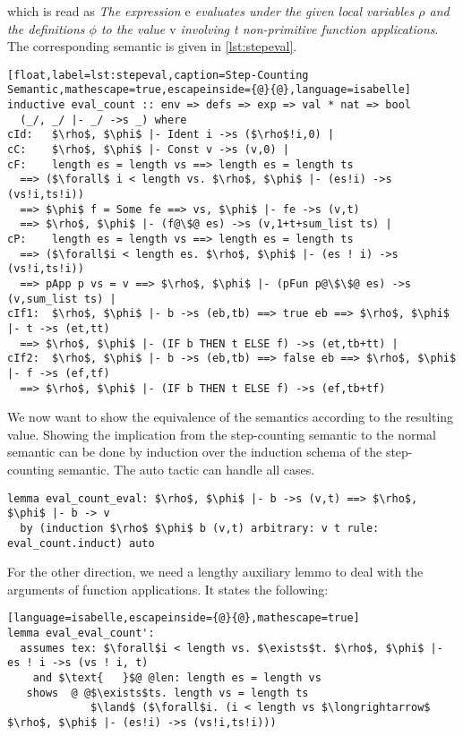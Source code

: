 which is read as \textit{The expression $\text{e}$ evaluates under the given local variables $\rho$ and the definitions $\phi$ to the value $\text{v}$ involving t non-primitive function applications}. The corresponding semantic is given in \autoref{lst:stepeval}.
\begin{lstlisting}[float,label=lst:stepeval,caption=Step-Counting Semantic,mathescape=true,escapeinside={@}{@},language=isabelle]
inductive eval_count :: env => defs => exp => val * nat => bool
  (_/, _/ |- _/ ->s _) where
cId:   $\rho$, $\phi$ |- Ident i ->s ($\rho$!i,0) |
cC:    $\rho$, $\phi$ |- Const v ->s (v,0) |
cF:    length es = length vs ==> length es = length ts
  ==> ($\forall$ i < length vs. $\rho$, $\phi$ |- (es!i) ->s (vs!i,ts!i))
  ==> $\phi$ f = Some fe ==> vs, $\phi$ |- fe ->s (v,t)
  ==> $\rho$, $\phi$ |- (f@\$@ es) ->s (v,1+t+sum_list ts) |
cP:    length es = length vs ==> length es = length ts
  ==> ($\forall$i < length es. $\rho$, $\phi$ |- (es ! i) ->s (vs!i,ts!i))
  ==> pApp p vs = v ==> $\rho$, $\phi$ |- (pFun p@\$\$@ es) ->s (v,sum_list ts) |
cIf1:  $\rho$, $\phi$ |- b ->s (eb,tb) ==> true eb ==> $\rho$, $\phi$ |- t ->s (et,tt)
  ==> $\rho$, $\phi$ |- (IF b THEN t ELSE f) ->s (et,tb+tt) |
cIf2:  $\rho$, $\phi$ |- b ->s (eb,tb) ==> false eb ==> $\rho$, $\phi$ |- f ->s (ef,tf)
  ==> $\rho$, $\phi$ |- (IF b THEN t ELSE f) ->s (ef,tb+tf)
\end{lstlisting}

We now want to show the equivalence of the semantics according to the resulting value.
Showing the implication from the step-counting semantic to the normal semantic can be done by induction over the induction schema of the step-counting semantic.
The auto tactic can handle all cases.
\begin{lstlisting}[language=isabelle,mathescape=true]
  lemma eval_count_eval: $\rho$, $\phi$ |- b ->s (v,t) ==> $\rho$, $\phi$ |- b -> v
  by (induction $\rho$ $\phi$ b (v,t) arbitrary: v t rule: eval_count.induct) auto
\end{lstlisting}

For the other direction, we need a lengthy auxiliary lemmo to deal with the arguments of function applications.
It states the following:
\begin{lstlisting}[language=isabelle,escapeinside={@}{@},mathescape=true]
lemma eval_eval_count':
  assumes tex: $\forall$i < length vs. $\exists$t. $\rho$, $\phi$ |- es ! i ->s (vs ! i, t)
    and $\text{   }$@ @len: length es = length vs
   shows  @ @$\exists$ts. length vs = length ts
             $\land$ ($\forall$i. (i < length vs $\longrightarrow$ $\rho$, $\phi$ |- (es!i) ->s (vs!i,ts!i)))
\end{lstlisting}

